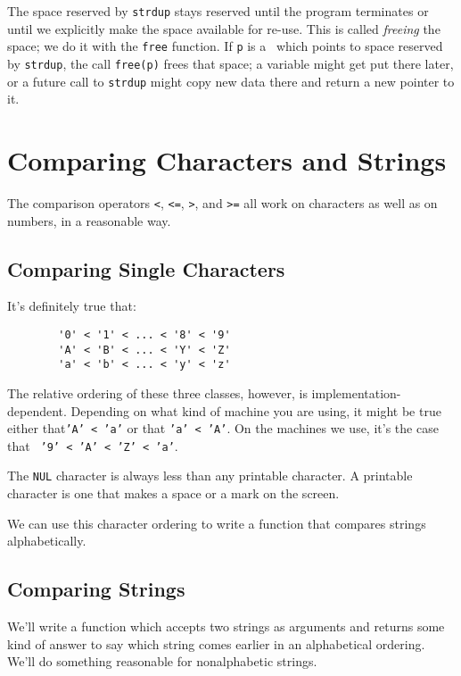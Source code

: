 The space reserved by {\tt strdup} stays reserved until the program
terminates or until we explicitly make the space available for re-use.
This is called {\em freeing}\/ the space; we do it with the {\tt free}
function.  If {\tt p} is a \Char\ which points to space reserved by
{\tt strdup}, the call {\tt free(p)} frees that space; a variable might
get put there later, or a future call to {\tt strdup} might copy new
data there and return a new pointer to it.  

\section{Comparing Characters and Strings}

The comparison operators {\tt <}, {\tt <=}, {\tt >}, and {\tt >=} all
work on characters as well as on numbers, in a reasonable way. 

\subsection{Comparing Single Characters}

It's definitely true that:

\begin{verbatim}
        '0' < '1' < ... < '8' < '9'
        'A' < 'B' < ... < 'Y' < 'Z'
        'a' < 'b' < ... < 'y' < 'z'
\end{verbatim}

The relative ordering of these three classes, however, is
implementation-dependent.  Depending on what kind of machine you are
using, it might be true either that\mbox {\tt 'A' < 'a'} or that
\mbox{\tt 'a' < 'A'}.  On the machines we use, it's the case that {\tt
'9' < 'A' < 'Z' < 'a'}.

The {\tt NUL} character is always less than any printable character.  A
printable character is one that makes a space or a mark on the screen.

We can use this character ordering to write a function that compares
strings alphabetically. 

\subsection{Comparing Strings}

We'll write a function which accepts two strings as arguments and
returns some kind of answer to say which string comes earlier in an
alphabetical ordering.  We'll do something reasonable for nonalphabetic
strings.  

